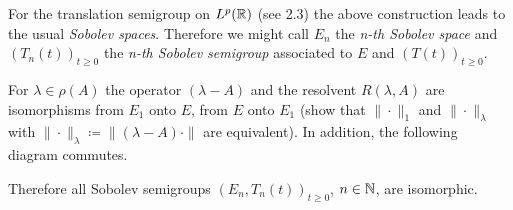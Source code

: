 %
%
For the translation semigroup on $L^{p}(\mathbb{R})$ (see 2.3) the above construction leads to the usual \emph{Sobolev spaces}.
Therefore we might call $E_{n}$ the \emph{n-th Sobolev space} and $(T_{n}(t))_{t \geq 0}$ the \emph{n-th Sobolev semigroup} associated to $E$ and $(T(t))_{t \geq 0}$.
\begin{remark}\label{rem:a1-19.1}
For $\lambda \in \rho(A)$ the operator $(\lambda - A)$ and the resolvent $R(\lambda,A)$ are isomorphisms from $E_{1}$ onto $E$, \resp from $E$ onto $E_{1}$ (show that $\|\cdot\|_{1}$ and $\|\cdot\|_{\lambda}$ with $\|\cdot\|_{\lambda} \coloneqq \|(\lambda - A)\cdot\|$ are equivalent).
In addition, the following diagram commutes. 
\begin{center}
\end{center}
Therefore all Sobolev semigroups $(E_{n}, T_{n}(t))_{t \geq 0}$, $n \in \mathbb{N}$, are isomorphic.
\end{remark}
